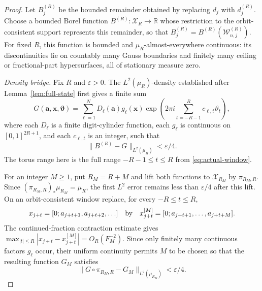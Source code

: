 \documentclass[11pt,a4paper]{amsart}
\theoremstyle{definition}
\theoremstyle{remark}
\newcommand{\R}{\mathbb R}
\begin{document}
\begin{proof}
Let $B_j^{(R)}$ be the bounded remainder obtained by replacing $d_j$ with
$d_j^{(R)}$.  Choose a bounded Borel function
$B^{(R)}:\mathcal X_R\to\R$ whose restriction to the orbit-consistent support
represents this remainder, so that
$B_j^{(R)}=B^{(R)}(\mathcal W_{n,j}^{(R)})$.  For fixed $R$, this function is
bounded and $\mu_R$-almost-everywhere continuous: its discontinuities lie on
countably many Gauss boundaries and finitely many ceiling or fractional-part
hypersurfaces, all of stationary measure zero.

\medskip
\noindent\textit{Density bridge.}
Fix $R$ and $\varepsilon>0$.  The $L^2(\mu_R)$-density established after
Lemma~\ref{lem:full-state} first gives a finite sum
\[
 G(\mathbf a,\mathbf x,\boldsymbol\vartheta)
 =\sum_{\ell=1}^N D_\ell(\mathbf a)g_\ell(\mathbf x)
   \exp\!\left(2\pi i\sum_{t=-R-1}^{R}
                    c_{\ell,t}\vartheta_t\right),
\]
where each $D_\ell$ is a finite digit-cylinder function, each $g_\ell$ is
continuous on $[0,1]^{2R+1}$, and each $c_{\ell,t}$ is an integer, such that
\[
 \|B^{(R)}-G\|_{L^2(\mu_R)}<\varepsilon/4.
\]
The torus range here is the full range $-R-1\le t\le R$ from
\eqref{eq:actual-window}.

For an integer $M\ge1$, put $R_M=R+M$ and lift both functions to
$\mathcal X_{R_M}$ by $\pi_{R_M,R}$.  Since
$(\pi_{R_M,R})_*\mu_{R_M}=\mu_R$, the first $L^2$ error remains less than
$\varepsilon/4$ after this lift.  On an orbit-consistent window replace,
for every $-R\le t\le R$,
\[
 x_{j+t}=[0;a_{j+t+1},a_{j+t+2},\ldots]
 \quad\hbox{by}\quad
 x_{j+t}^{[M]}=[0;a_{j+t+1},\ldots,a_{j+t+M}].
\]
The continued-fraction contraction estimate gives
$\max_{|t|\le R}|x_{j+t}-x_{j+t}^{[M]}|=O_R(F_M^{-2})$.  Since only finitely
many continuous factors $g_\ell$ occur, their uniform continuity permits $M$
to be chosen so that the resulting function $G_M$ satisfies
\[
 \|G\circ\pi_{R_M,R}-G_M\|_{L^2(\mu_{R_M})}<\varepsilon/4.
\]


\end{proof}
\end{document}
